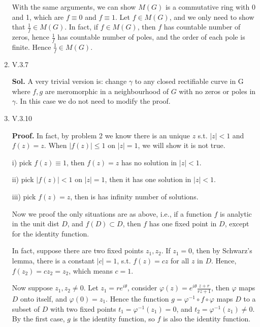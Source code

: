 \documentclass{article}%
\begin{document}
\begin{enumerate}
With the same arguments, we can show $M(G)$ is a commutative ring with 0 and 1, which are $f\equiv 0$ and $f\equiv 1$. Let $f\in M(G)$, and we only need to show that $\frac{1}{f}\in M(G)$. In fact, if $f\in M(G)$, then $f$ has countable number of zeros, hence $\frac{1}{f}$ has countable number of poles, and the order of each pole is finite. Hence $\frac{1}{f}\in M(G)$.

\item V.3.7

\textbf{Sol.} A very trivial version is: change $\gamma$ to any closed rectifiable curve in G where $f, g$ are meromorphic in a neighbourhood of $G$ with no zeros or poles in $\gamma$. In this case we do not need to modify the proof.



\item V.3.10

\textbf{Proof.} In fact, by problem 2 we know there is an unique $z$ s.t. $|z| < 1$ and $f(z) = z$. When $|f(z)| \le 1$ on $|z| = 1$, we will show it is not true.

i) pick $f(z) \equiv 1$, then $f(z) = z$ has no solution in $|z| < 1$.

ii) pick $|f(z)| < 1$ on $|z| = 1$, then it has one solution in $|z| < 1$.

iii) pick $f(z) = z$, then is has infinity number of solutions.

Now we proof the only situations are as above, i.e., if a function $f$ is analytic in the unit dist $D$, and $f(D)\subset D$, then $f$ has one fixed point in $D$, except for the identity function.

In fact, suppose there are two fixed points $z_1, z_2 $. If $z_1 = 0$, then by Schwarz's lemma, there is a constant $|c| = 1$, s.t. $f(z) = cz$ for all $z$ in $D$. Hence, $f(z_2) = cz_2 = z_2 $, which means $c = 1$.

Now suppose $z_1, z_2\ne 0 $. Let $z_1 = re^{i\theta} $, consider $\varphi(z) = e^{i\theta}\frac{z+r}{rz+1}$, then $\varphi$ maps $D$ onto itself, and $\varphi(0) = z_1 $. Hence the function $g = \varphi^{-1} \circ f\circ\varphi$ maps $D$ to a subset of $D$ with two fixed points $t_1 = \varphi^{-1}(z_1) = 0 $, and $t_2 = \varphi^{-1}(z_1) \ne 0 $. By the first case, $g$ is the identity function, so $f$ is also the identity function.

\end{enumerate}
\end{document}
